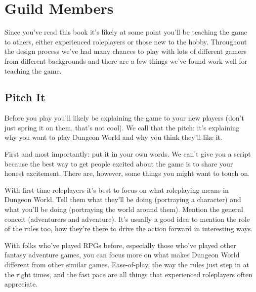 \chapter{Guild Members}
   
 





 



Since you've read this book it's likely at some point you'll be teaching the game to others, either experienced roleplayers or those new to the hobby. Throughout the design process we've had many chances to play with lots of different gamers from different backgrounds and there are a few things we've found work well for teaching the game.

 
\section{Pitch It}   
 

Before you play you'll likely be explaining the game to your new players (don't just spring it on them, that's not cool). We call that the pitch: it's explaining why you want to play Dungeon World and why you think they'll like it.

 

First and most importantly: put it in your own words. We can't give you a script because the best way to get people excited about the game is to share your honest excitement. There are, however, some things you might want to touch on.

 

With first-time roleplayers it's best to focus on what roleplaying means in Dungeon World. Tell them what they'll be doing (portraying a character) and what you'll be doing (portraying the world around them). Mention the general conceit (adventurers and adventure). It's usually a good idea to mention the role of the rules too, how they're there to drive the action forward in interesting ways.

 

With folks who've played RPGs before, especially those who've played other fantasy adventure games, you can focus more on what makes Dungeon World different from other similar games. Ease-of-play, the way the rules just step in at the right times, and the fast pace are all things that experienced roleplayers often appreciate.

 

